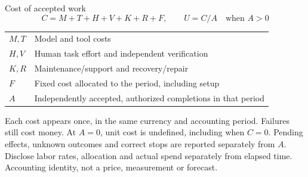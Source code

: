 \begin{frame}[label=economics]{Cost of accepted work}
\[
C=M+T+H+V+K+R+F,\qquad U=C/A\quad\text{when }A>0
\]
{\small
\begin{tabular}{p{.14\linewidth}p{.77\linewidth}}
$M,T$ & Model and tool costs \\
$H,V$ & Human task effort and independent verification \\
$K,R$ & Maintenance/support and recovery/repair \\
$F$ & Fixed cost allocated to the period, including setup \\
$A$ & Independently accepted, authorized completions in that period \\
\end{tabular}}
\par\medskip
Each cost appears once, in the same currency and accounting period.
Failures still cost money. At $A=0$, unit cost is undefined, including when $C=0$.
\vfill
{\footnotesize Pending effects, unknown outcomes and correct stops are reported
separately from $A$. Disclose labor rates, allocation and actual spend separately
from elapsed time. Accounting identity, not a price, measurement or forecast.}
\end{frame}
